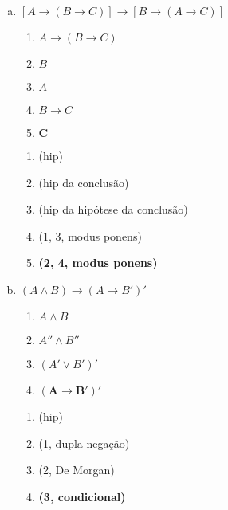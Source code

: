 \begin{Gabarito}{11}
\begin{enumerate}[a)]
\begin{multicols}{2}
      \end{multicols}

      \item $[A \rightarrow (B \rightarrow C)] \rightarrow [B \rightarrow (A \rightarrow C)]$ \\
      \begin{multicols}{2}

        \begin{enumerate}[1.]
          \item $A \rightarrow (B \rightarrow C)$
          \item $B$
          \item $A$
          \item $B \rightarrow C$
          \item $\boldsymbol{C}$
        \end{enumerate}

        \columnbreak

        \begin{enumerate}[\ding{32}]
          \item (hip)
          \item (hip da conclusão)
          \item (hip da hipótese da conclusão)
          \item (1, 3, modus ponens)
          \item \textbf{(2, 4, modus ponens)}
        \end{enumerate}

      \end{multicols}

      \item $(A \wedge B) \rightarrow (A \rightarrow B')'$ \\
      \begin{multicols}{2}

        \begin{enumerate}[1.]
          \item $A \wedge B$
          \item $A'' \wedge B''$
          \item $(A' \lor B')'$
          \item $\boldsymbol{(A \rightarrow B')'}$
        \end{enumerate}

        \columnbreak

        \begin{enumerate}[\ding{32}]
          \item (hip)
          \item (1, dupla negação)
          \item (2, De Morgan)
          \item \textbf{(3, condicional)}
        \end{enumerate}

      \end{multicols}

    \end{enumerate}
  
\end{Gabarito}
